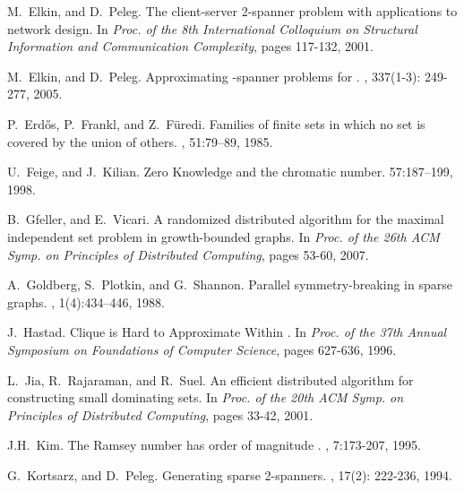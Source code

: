 \documentclass[11pt]{article}
\begin{document}
\begin{thebibliography}{10}
M.~Elkin, and D.~Peleg.
\newblock The client-server 2-spanner problem with applications to network design. 
\newblock In {\em Proc. of the 8th International Colloquium on Structural Information and Communication Complexity}, pages 117-132, 2001.




M.~Elkin, and D.~Peleg.
\newblock Approximating -spanner problems for .
, 337(1-3): 249-277, 2005.


P.~Erd\H{o}s, P.~Frankl, and Z.~F\"uredi.
\newblock Families of finite sets in which no set is covered by the union of  others.
, 51:79--89, 1985.

U.~Feige, and J.~Kilian.
\newblock Zero Knowledge and the chromatic number.
 57:187--199, 1998.


B.~Gfeller, and E.~Vicari.
\newblock A randomized distributed algorithm for the maximal independent set problem in growth-bounded graphs.
\newblock In {\em Proc. of the 26th ACM Symp. on Principles of Distributed Computing}, pages 53-60, 2007.

A.~Goldberg, S.~Plotkin, and  G.~Shannon.
\newblock Parallel symmetry-breaking in sparse graphs.
, 1(4):434--446, 1988.







J.~Hastad.
\newblock Clique is Hard to Approximate Within . 
\newblock In {\em Proc. of the 37th Annual Symposium on Foundations of Computer Science}, pages 627-636, 1996.




L.~Jia, R.~Rajaraman, and R.~Suel.
\newblock An efficient distributed algorithm for constructing small dominating sets.
\newblock In {\em Proc. of the 20th ACM Symp. on Principles of Distributed Computing}, pages 33-42, 2001.




J.H.~Kim.
\newblock The Ramsey number  has order of magnitude .
, 7:173-207, 1995.


G.~Kortsarz, and D.~Peleg.
\newblock Generating sparse 2-spanners.
, 17(2): 222-236, 1994.



\end{thebibliography}
\end{document}

